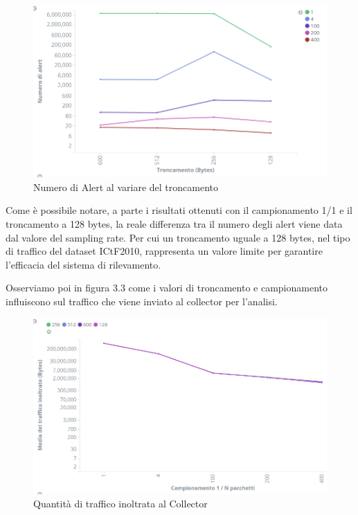 \documentclass[12pt,a4paper,openright,twoside]{report}
\begin{document}
\begin{figure}[h!]
\begin{center}                          %
  \includegraphics[width=\textwidth]{images/ICTF--tunc-vs-samp.png}
  \caption{Numero di Alert al variare del troncamento}
  \label{}
\end{center}
\end{figure}

Come \`e possibile notare, a parte i risultati ottenuti con il campionamento 1/1 e il
troncamento a 128 bytes, la reale differenza tra il numero degli alert viene data dal
valore del sampling rate. Per cui un troncamento uguale a 128 bytes, nel tipo di traffico del dataset ICtF2010,
rappresenta un valore limite per garantire l'efficacia del sistema di rilevamento.

Osserviamo poi in figura 3.3 come i valori di troncamento e campionamento influiscono sul traffico
che viene inviato al collector per l'analisi.

\begin{figure}[h!]
\begin{center}                          %
  \includegraphics[width=\textwidth]{images/ICTF-samp-vs-traffic.png}
  \caption{Quantit\`a di traffico inoltrata al Collector}
  \label{}
\end{center}
\end{figure}
\end{document}
